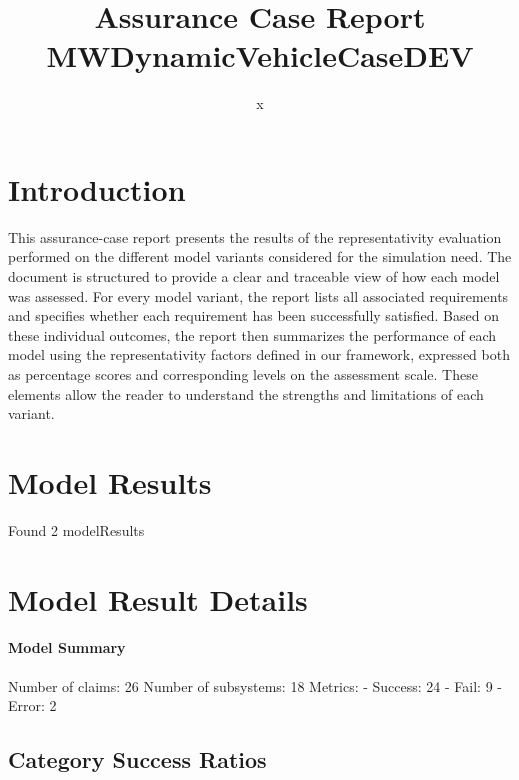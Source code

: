 \documentclass{article}
\title{Assurance Case Report MWDynamicVehicleCaseDEV}
\author{x}
\begin{document}
	\maketitle
	\section{Introduction}
	This assurance-case report presents the results of the 
	representativity evaluation performed on the different model variants considered for 
	the simulation need. The document is structured to provide a clear and traceable view of how 
	each model was assessed. For every model variant, the report lists all associated requirements
	 and specifies whether each requirement has been successfully satisfied. Based on these 
	individual outcomes, the report then summarizes the performance of each model using the 
	representativity factors defined in our framework, expressed both as percentage scores 
	and corresponding levels on the assessment scale. These elements allow the reader to understand 
	the strengths and limitations of each variant.
	 
	\section{Model Results}
    Found 2 modelResults
		
			\section{Model Result Details} 
			\paragraph{Model Summary}
			Number of claims: 26
			Number of subsystems: 18
			Metrics:
			- Success: 24
			- Fail: 9
			- Error: 2
			
	

					\subsection{Category Success Ratios}
						
\end{document}
